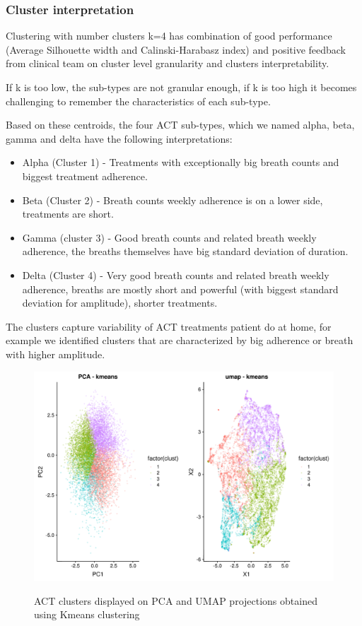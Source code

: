 \documentclass{article}
\begin{document}
\subsubsection{Cluster interpretation}
\label{appendix:actKmeansinterpretation}
Clustering with number clusters k=4 has combination of good performance (Average Silhouette width and Calinski-Harabasz index) and positive feedback from clinical team on cluster level granularity and clusters interpretability. 

If k is too low, the sub-types are not granular enough, if k is too high it becomes challenging to remember the characteristics of each sub-type.

 Based on these centroids, the four ACT sub-types, which we named alpha, beta, gamma and delta have the following interpretations: 

\begin{itemize}
\item Alpha (Cluster 1) - Treatments with exceptionally big breath counts and biggest treatment adherence.
\item Beta (Cluster 2) - Breath counts weekly adherence is on a lower side, treatments are short.
\item Gamma (cluster 3) -  Good breath counts and related breath weekly adherence, the breaths themselves have big standard deviation of duration.
\item Delta (Cluster 4) - Very good breath counts and related breath weekly adherence,  breaths are mostly short and powerful (with biggest standard deviation for amplitude), shorter treatments.
\end{itemize}

The clusters capture variability of ACT treatments patient do at home, for example we identified clusters that are characterized by big adherence or breath with higher amplitude.

\begin{figure}[H]
  \centering
  \caption{ACT clusters displayed on PCA and UMAP projections obtained using Kmeans clustering}
  \includegraphics[scale=0.5]{fig_ACT_4_clusters.png}
  \label{fig:figACT4clusters}
\end{figure}
\end{document}

